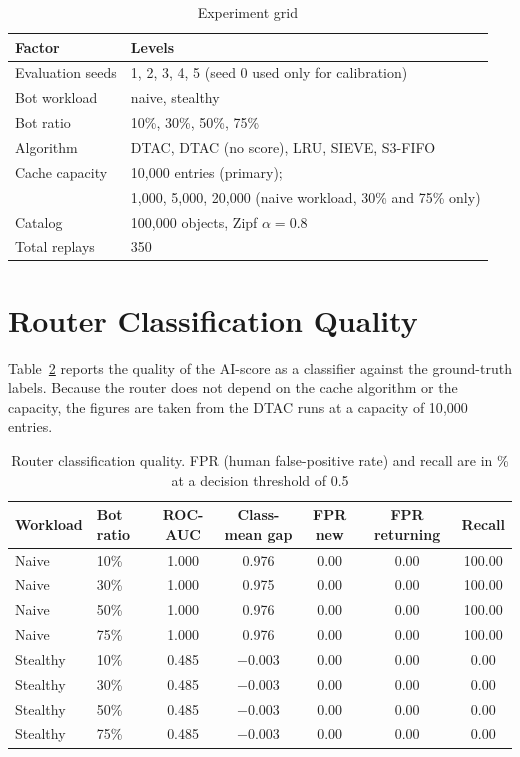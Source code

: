 \begin{table}[htbp]
    \centering
    \caption{Experiment grid}
    \label{tab:grid}
    \begin{tabular}{ll}
        \toprule
        Factor & Levels \\
        \midrule
        Evaluation seeds & 1, 2, 3, 4, 5 (seed 0 used only for calibration) \\
        Bot workload & naive, stealthy \\
        Bot ratio & 10\%, 30\%, 50\%, 75\% \\
        Algorithm & DTAC, DTAC (no score), LRU, SIEVE, S3-FIFO \\
        Cache capacity & 10{,}000 entries (primary); \\
         & 1{,}000, 5{,}000, 20{,}000 (naive workload, 30\% and 75\% only) \\
        Catalog & 100{,}000 objects, Zipf $\alpha = 0.8$ \\
        Total replays & 350 \\
        \bottomrule
    \end{tabular}
\end{table}

\section{Router Classification Quality}
Table~\ref{tab:router} reports the quality of the AI-score as a classifier against the ground-truth labels. Because the router does not depend on the cache algorithm or the capacity, the figures are taken from the DTAC runs at a capacity of 10{,}000 entries.

\begin{table}[htbp]
    \centering
    \caption{Router classification quality. FPR (human false-positive rate) and recall are in \% at a decision threshold of 0.5}
    \label{tab:router}
    \small
    \setlength{\tabcolsep}{4pt}
    \begin{tabular}{llccccc}
        \toprule
        Workload & Bot ratio & ROC-AUC & Class-mean gap & FPR new & FPR returning & Recall \\
        \midrule
        Naive & 10\% & 1.000 & 0.976 & 0.00 & 0.00 & 100.00 \\
        Naive & 30\% & 1.000 & 0.975 & 0.00 & 0.00 & 100.00 \\
        Naive & 50\% & 1.000 & 0.976 & 0.00 & 0.00 & 100.00 \\
        Naive & 75\% & 1.000 & 0.976 & 0.00 & 0.00 & 100.00 \\
        \midrule
        Stealthy & 10\% & 0.485 & $-0.003$ & 0.00 & 0.00 & 0.00 \\
        Stealthy & 30\% & 0.485 & $-0.003$ & 0.00 & 0.00 & 0.00 \\
        Stealthy & 50\% & 0.485 & $-0.003$ & 0.00 & 0.00 & 0.00 \\
        Stealthy & 75\% & 0.485 & $-0.003$ & 0.00 & 0.00 & 0.00 \\
        \bottomrule
    \end{tabular}
\end{table}

